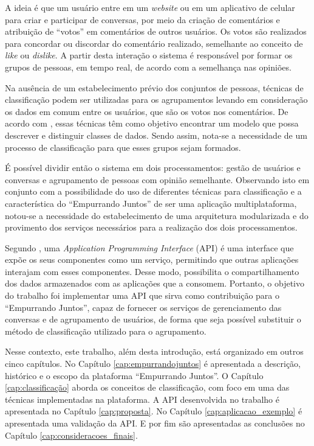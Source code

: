 A ideia é que um usuário entre em um \textit{website} ou em um aplicativo de celular para criar e participar de conversas, 
por meio da criação de comentários e atribuição de ``votos'' em comentários de outros usuários.
Os votos são realizados para concordar ou discordar do comentário realizado, semelhante ao conceito de \textit{like} ou \textit{dislike}.
A partir desta interação o sistema é responsável por formar os grupos de pessoas, em tempo real, de acordo com a semelhança nas opiniões.

Na ausência de um estabelecimento prévio dos conjuntos de pessoas, técnicas de classificação podem ser utilizadas para os agrupamentos
levando em consideração os dados em comum entre os usuários, que são os votos nos comentários.
De acordo com , essas técnicas
têm como objetivo encontrar um modelo que possa descrever e distinguir classes de dados.
Sendo assim, nota-se a necessidade de um processo de classificação para que esses grupos sejam formados.

É possível dividir então o sistema em dois processamentos: 
gestão de usuários e conversas e agrupamento de pessoas com opinião semelhante. 
Observando isto em conjunto com a possibilidade do uso de diferentes técnicas para classificação 
e a característica do ``Empurrando Juntos'' de ser uma aplicação multiplataforma, notou-se
a necessidade do estabelecimento de uma arquitetura modularizada e do provimento dos serviços necessários para a realização
dos dois processamentos.

Segundo , uma \textit{Application Programming Interface} (API)
é uma interface que expõe os seus componentes como um serviço, permitindo que outras aplicações interajam com esses 
componentes. Desse modo, possibilita o compartilhamento dos dados armazenados com as aplicações que a consomem.
Portanto, o objetivo do trabalho foi implementar uma API que sirva como contribuição para o ``Empurrando Juntos'',
capaz de fornecer os serviços de gerenciamento das conversas e de agrupamento de usuários, de forma que seja possível substituir
o método de classificação utilizado para o agrupamento.

Nesse contexto, este trabalho, além desta introdução, está organizado em outros cinco capítulos.
No Capítulo \ref{cap:empurrandojuntos} é apresentada a descrição, histórico e o escopo da plataforma ``Empurrando Juntos''.
O Capítulo \ref{cap:classificação} aborda os conceitos de classificação, com foco em uma das técnicas implementadas na plataforma. 
A API desenvolvida no trabalho é apresentada no Capítulo \ref{cap:proposta}. No Capítulo \ref{cap:aplicacao_exemplo} é
apresentada uma validação da API. E por fim são apresentadas as conclusões no Capítulo \ref{cap:consideracoes_finais}.
